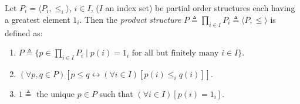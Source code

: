 Let $P_i = \langle P_i, \leq_i \rangle$, $i \in I$, ($I$ an index set) be partial order structures each having a greatest element $1_i$. Then the \textit{product structure} $P \triangleq \prod_{i \in I} P_i \triangleq \langle P, \leq \rangle$ is defined as:
\begin{enumerate}
\item $P \triangleq \{p \in \prod_{i \in I} P_i \mid p(i) = 1_i \text{ for all but finitely many } i \in I\}$.
\item $(\forall p, q \in P)[p \leq q \leftrightarrow (\forall i \in I)[p(i) \leq_i q(i)]]$.
\item $1 \triangleq$ the unique $p \in P$ such that $(\forall i \in I)[p(i) = 1_i]$.
\end{enumerate}

